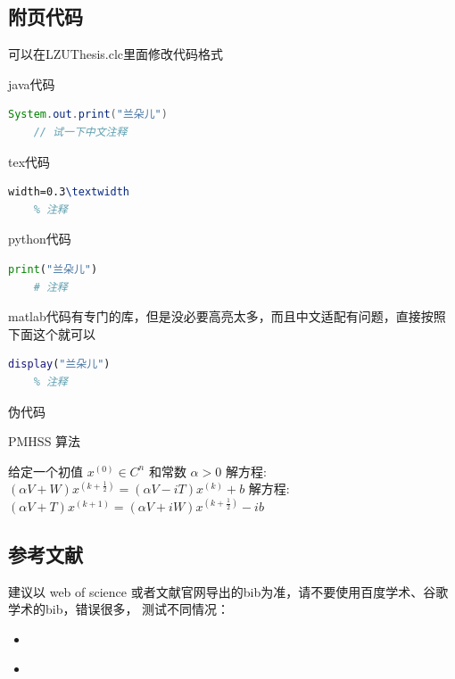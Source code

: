 \documentclass[AutoFakeBold]{LZUThesis}
\begin{document}
\subsection{附页代码} %
\label{sub:附页代码}
可以在LZUThesis.clc里面修改代码格式

java代码
\begin{lstlisting}[language = java]
    System.out.print("兰朵儿")
    // 试一下中文注释
\end{lstlisting}


tex代码
\begin{lstlisting}[language = tex]
    width=0.3\textwidth
    % 注释
\end{lstlisting}

python代码
\begin{lstlisting}[language = python]
    print("兰朵儿")
    # 注释
\end{lstlisting}

matlab代码有专门的库，但是没必要高亮太多，而且中文适配有问题，直接按照下面这个就可以
\begin{lstlisting}[language = matlab]
    display("兰朵儿")
    % 注释
\end{lstlisting}


伪代码

\begin{algorithm}[H]
    \caption{PMHSS 算法\label{Alg:PMHSS}}
    \begin{algorithmic}[1]
        \State 给定一个初值 $ x^{(0)} \in C^{n} $  和常数 $\alpha>0$
        \State 解方程: $(\alpha V+W)x^{(k+\frac{1}{2})}=(\alpha V-i T)x^{(k)}+b $
        \State 解方程: $(\alpha V+T)x^{(k+1)}=(\alpha V+i W)x^{(k+\frac{1}{2})}-i b$
        \EndFor
    \end{algorithmic}
\end{algorithm}

\subsection{参考文献} %
\label{sub:参考文献}

建议以 web of science 或者文献官网导出的bib为准，请不要使用百度学术、谷歌学术的bib，错误很多，
测试不同情况：

\begin{itemize}
    \item \cite{圆柱形永磁体磁场建模及仿真研究}
    \item \cite{Numerical_Analysis}
\end{itemize}
\end{document}
